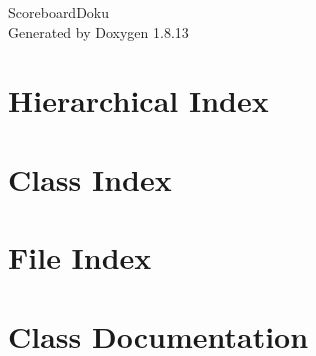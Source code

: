 \documentclass[twoside]{book}
\newcommand{\+}{\discretionary{\mbox{\scriptsize$\hookleftarrow$}}{}{}}
\newcommand{\clearemptydoublepage}{%
  \newpage{\pagestyle{empty}\cleardoublepage}%
}
\begin{document}
\hypersetup{pageanchor=false,
             bookmarksnumbered=true,
             pdfencoding=unicode
            }
\begin{titlepage}
\vspace*{7cm}
\begin{center}%
{\Large Scoreboard\+Doku }\\
\vspace*{1cm}
{\large Generated by Doxygen 1.8.13}\\
\end{center}
\end{titlepage}
\clearemptydoublepage
{}
\tableofcontents
\clearemptydoublepage
{}
\hypersetup{pageanchor=true}

\chapter{Hierarchical Index}

\chapter{Class Index}

\chapter{File Index}

\chapter{Class Documentation}





















\end{document}
